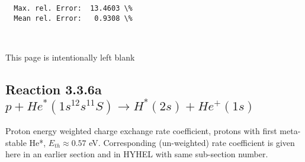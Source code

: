 \documentclass[12pt,dvipdfmx]{article}
\begin{document}
\begin{small}
\begin{verbatim}
  Max. rel. Error:  13.4603 \%
  Mean rel. Error:   0.9308 \%



\end{verbatim}\end{small}

\newpage
This page is intentionally left blank
\newpage

\subsection{
Reaction 3.3.6a $   p + He^*(1s^12s^11S) \rightarrow H^*(2s) + He^+(1s) $
}
Proton energy weighted charge exchange rate coefficient,
protons with first meta-stable He*, $E_{th} \approx 0.57$ eV.
Corresponding (un-weighted) rate coefficient is given here in an earlier section and in HYHEL with same sub-section number.
\end{document}
